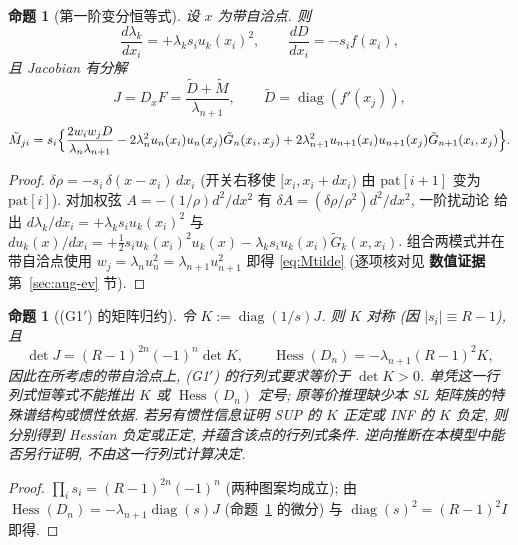 \documentclass[UTF8]{ctexart}
\newtheorem{proposition}[theorem]{命题}
\newcommand{\EVIDENCE}{\textbf{数值证据}}
\begin{document}
\begin{proposition}[第一阶变分恒等式]\label{prop:firstorder}
设 $x$ 为带自洽点. 则
\begin{equation*}
	\frac{d\lambda_k}{dx_i}=+\lambda_k s_i u_k(x_i)^2,\qquad
	\frac{dD}{dx_i}=-s_i f(x_i),
\end{equation*}
且 Jacobian 有分解
\begin{equation*}
	J=D_xF=\frac{\tilde D+\tilde M}{\lambda_{n+1}},\qquad
	\tilde D=\operatorname{diag}(f'(x_j)),
\end{equation*}
\begin{equation}\label{eq:Mtilde}
	\tilde M_{ji}=s_i\Bigl\{
	\frac{2w_iw_jD}{\lambda_n\lambda_{n+1}}
	-2\lambda_n^2u_n(x_i)u_n(x_j)\tilde G_n(x_i,x_j)
	+2\lambda_{n+1}^2u_{n+1}(x_i)u_{n+1}(x_j)\tilde G_{n+1}(x_i,x_j)\Bigr\}.
\end{equation}
\end{proposition}
\begin{proof}
$\delta\rho=-s_i\,\delta(x-x_i)\,dx_i$ (开关右移使 $[x_i,x_i+dx_i)$ 由
$\mathrm{pat}[i+1]$ 变为 $\mathrm{pat}[i]$). 对加权弦
$A=-(1/\rho)d^2/dx^2$ 有 $\delta A=(\delta\rho/\rho^2)d^2/dx^2$, 一阶扰动论
给出 $d\lambda_k/dx_i=+\lambda_ks_iu_k(x_i)^2$ 与
$du_k(x)/dx_i=+\frac12s_iu_k(x_i)^2u_k(x)-\lambda_ks_iu_k(x_i)\tilde G_k(x,x_i)$.
组合两模式并在带自洽点使用 $w_j=\lambda_nu_n^2=\lambda_{n+1}u_{n+1}^2$
即得 \eqref{eq:Mtilde} (逐项核对见 \EVIDENCE 第~\ref{sec:aug-ev} 节).
\end{proof}

\begin{proposition}[(G1$'$) 的矩阵归约]\label{prop:K}
令 $K:=\operatorname{diag}(1/s)J$. 则 $K$ 对称
(因 $|s_i|\equiv R-1$), 且
\begin{equation}\label{eq:detK}
	\det J=(R-1)^{2n}(-1)^n\det K,\qquad
	\operatorname{Hess}(D_n)=-\lambda_{n+1}(R-1)^2K,
\end{equation}
因此在所考虑的带自洽点上, (G1$'$) 的行列式要求等价于 $\det K>0$.
单凭这一行列式恒等式不能推出 $K$ 或 $\operatorname{Hess}(D_n)$ 定号;
原等价推理缺少本 SL 矩阵族的特殊谱结构或惯性依据.
若另有惯性信息证明 SUP 的 $K$ 正定或 INF 的 $K$ 负定, 则分别得到
Hessian 负定或正定, 并蕴含该点的行列式条件.
逆向推断在本模型中能否另行证明, 不由这一行列式计算决定.
\end{proposition}
\begin{proof}
$\prod_is_i=(R-1)^{2n}(-1)^n$ (两种图案均成立); 由
$\operatorname{Hess}(D_n)=-\lambda_{n+1}\operatorname{diag}(s)J$ (命题~\ref{prop:firstorder}
的微分) 与 $\operatorname{diag}(s)^2=(R-1)^2I$ 即得.
\end{proof}
\end{document}
